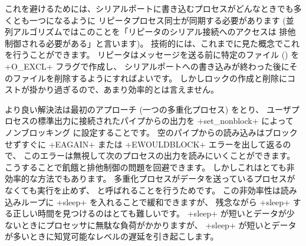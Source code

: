 これを避けるためには、シリアルポートに書き込むプロセスがどんなときでも多くとも一つになるように
リピータプロセス同士が同期する必要があります (並列アルゴリズムではこのことを「リピータのシリアル接続へのアクセスは
排他制御される必要がある」と言います)。
技術的には、これまでに見た概念でこれを行うことができます。
リピータはメッセージを送る前に特定のファイル () を \ml+O_EXCL+ フラグで作成し、
シリアルポートへの書き込みが終わった後にそのファイルを削除するようにすればよいです。
しかしロックの作成と削除にコストが掛かり過ぎるので、あまり効率的とは言えません。

より良い解決法は最初のアプローチ (一つの多重化プロセス) をとり、
ユーザプロセスの標準出力に接続されたパイプからの出力を \ml+set_nonblock+ によってノンブロッキング
に設定することです。
空のパイプからの読み込みはブロックせずすぐに \ml+EAGAIN+ または \ml+EWOULDBLOCK+ エラーを出して返るので、
このエラーは無視して次のプロセスの出力を読みにいくことができます。
こうすることで飢餓と排他制御の問題を回避できます。
しかしこれはとても非効率的な方法でもあります。
多重化プロセスがデータを送っているプロセスがなくても実行を止めず、
 と呼ばれることを行うためです。
この非効率性は読み込みループに \ml+sleep+ を入れることで緩和できますが、
残念ながら \ml+sleep+ する正しい時間を見つけるのはとても難しいです。
\ml+sleep+ が短いとデータが少ないときにプロセッサに無駄な負荷がかかりますが、
\ml+sleep+ が短いとデータが多いときに知覚可能なレベルの遅延を引き起こします。

